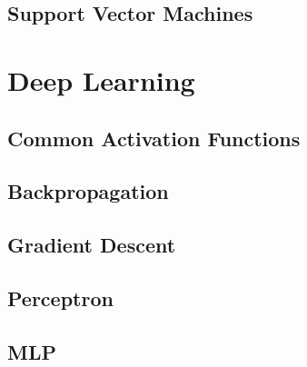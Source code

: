 \documentclass[18pt,a3paper,landscape, ncols=3]{cheatsheet}
\begin{document}
	\subsection{Support Vector Machines}
		\begin{mdframed}
			\vspace{10mm}
		\end{mdframed}
		\begin{mdframed}
			\vspace{30mm}
		\end{mdframed}

\section{Deep Learning} \seperator
	\subsection{Common Activation Functions}
		\begin{mdframed}
			\vspace{20mm}
		\end{mdframed}
	\subsection{Backpropagation}
		\begin{mdframed}
			\vspace{35mm}
		\end{mdframed}
	\subsection{Gradient Descent}
		\begin{mdframed}
			\vspace{35mm}
		\end{mdframed}
	\subsection{Perceptron}
		\begin{mdframed}
			\vspace{15mm}
		\end{mdframed}
	\subsection{MLP}
		\begin{mdframed}
			\vspace{15mm}
		\end{mdframed}
\end{document}
